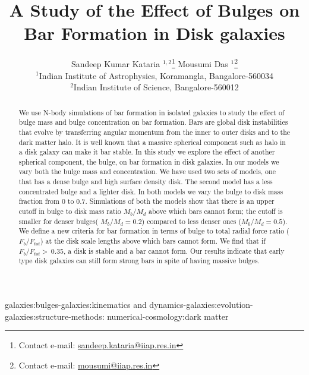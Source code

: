 \documentclass[a4paper,fleqn,usenatbib,useAMS]{mnras}
\title[Bulge effect on bar instability]{A Study of the Effect of Bulges on Bar Formation in Disk galaxies }
\author[Kataria \& Das]{Sandeep Kumar Kataria $^{1,2}$\thanks{Contact e-mail: \href{mailto:sandeep.kataria@iiap.res.in}{sandeep.kataria@iiap.res.in}} Mousumi Das $^1$\thanks{Contact e-mail: \href{mailto:mousumi@iiap.res.in}{mousumi@iiap.res.in}}
\\
$^{1}$Indian Institute of Astrophysics, Koramangla, Bangalore-560034\\
$^{2}$Indian Institute of Science, Bangalore-560012}
\begin{document}
\label{firstpage}
\pagerange{\pageref{firstpage}--\pageref{lastpage}}
\maketitle

\begin{abstract}
We use N-body simulations of bar formation in isolated galaxies to study the effect of bulge mass and bulge concentration on bar formation. Bars are global disk instabilities that evolve by transferring angular momentum from the inner to outer disks and to the dark matter halo. It is well known that a massive spherical component such as halo in a disk galaxy can make it bar stable. In this study we explore the effect of another spherical component, the bulge, on bar formation in disk galaxies. In our models we vary both the bulge mass and concentration. We have used two sets of models, one that has a dense bulge and high surface density disk. The second model has a less concentrated bulge and a lighter disk. In both models we vary the bulge to disk mass fraction from 0 to 0.7. Simulations of both the models show that there is an upper cutoff in bulge to disk mass ratio $M_b/M_d$ above which bars cannot form; the cutoff is smaller for denser bulges( $M_b/M_d = 0.2$) compared to less denser ones ($M_b/M_d = 0.5$). We define a new criteria for bar formation in terms of  bulge to total radial force ratio ($F_b/F_{tot}$) at the disk scale lengths above which bars cannot form. We find that if  $F_b/F_{tot}~$>~0.35, a disk is stable and a bar cannot form. Our results indicate that early type disk galaxies can still form strong bars in spite of having massive bulges.
\end{abstract}

\begin{keywords}
galaxies:bulges-galaxies:kinematics and dynamics-galaxies:evolution-galaxies:structure-methods: numerical-cosmology:dark matter
\end{keywords}



\end{document}
